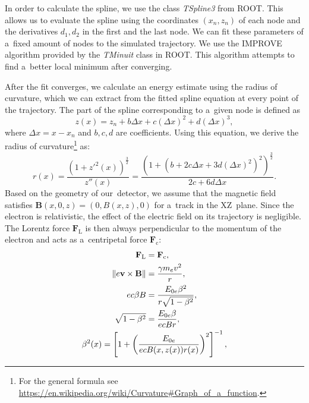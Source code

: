 		In order to calculate the spline, we use the class \textit{TSpline3} from ROOT. This allows us to evaluate the spline using the coordinates $(x_n,z_n)$ of each node and the derivatives $d_1,d_2$ in the first and the last node. We can fit these parameters of a~fixed amount of nodes to the simulated trajectory. We use the IMPROVE algorithm provided by the \textit{TMinuit} class in ROOT. This algorithm attempts to find a~better local minimum after converging.
		
		After the fit converges, we calculate an energy estimate using the radius of curvature, which we can extract from the fitted spline equation at every point of the trajectory. The part of the spline corresponding to a~given node is defined as
			\begin{equation}
				z(x) = z_n + b \Delta x+c(\Delta x)^2+d(\Delta x)^3,
			\end{equation}
		where $\Delta x = x-x_n$ and $b,c,d$ are coefficients. Using this equation, we derive the radius of curvature\footnote{For the general formula see \url{https://en.wikipedia.org/wiki/Curvature\#Graph_of_a_function}.} as:
			\begin{equation}
				r(x) = \frac{\left(1+z'^2(x)\right)^\frac{3}{2}}{z''(x)} = \frac{\left(1+\left(b+2c\Delta x+3d(\Delta x)^2\right)^2\right)^\frac{3}{2}}{2c+6d\Delta x}.
			\end{equation}
		Based on the geometry of our~detector, we assume that the magnetic field satisfies $\mathbf{B}(x,0,z) = (0,B(x,z),0)$ for a~track in the XZ~plane. Since the electron is relativistic, the effect of the electric field on its trajectory is negligible. The Lorentz force $\mathbf{F}_\text{L}$ is then always perpendicular to the momentum of the electron and acts as a~centripetal force $\mathbf{F}_\text{c}$:
			\begin{gather}
				\begin{aligned}
					\mathbf{F}_\text{L} &= \mathbf{F}_\text{c},\\
					\norm{e\mathbf{v}\times\mathbf{B}} &= \frac{\gamma m_e v^2}{r},\\
					e c\beta B &= \frac{E_{0e} \beta^2}{r\sqrt{1-\beta^2}},\\
					\sqrt{1-\beta^2} &= \frac{E_{0e} \beta}{ecBr},
				\end{aligned}\\
				\beta^2(x) = \left[1+\left(\frac{E_{0e}}{ecB(x,z(x))r(x)}\right)^2\right]^{-1}, \label{eq:ekin1}
			\end{gather}
